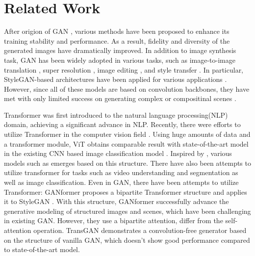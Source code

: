 \documentclass[10pt,twocolumn,letterpaper]{article}
\begin{document}
\section{Related Work}
After origion of GAN \cite{goodfellow2014generative}, various methods  \cite{arjovsky2017wasserstein, mao2017squares,miyato2018spectral,karras2018progressive} have been proposed to enhance its training stability and performance. As a result, fidelity and diversity of the generated images have dramatically improved. In addition to image synthesis task, GAN has been widely adopted in various tasks, such as image-to-image translation \cite{isola2018imagetoimage, zhu2020unpaired}, super resolution \cite{ledig2017photorealistic}, image editing \cite{yu2018generative}, and style transfer \cite{choi2018stargan}. In particular, StyleGAN-based architectures have been applied for various applications \cite{gabbay2019style,zhu2020semantically,Zhu_2020}. However, since all of these models are based on convolution backbones, they have met with only limited success on generating complex or compositinal scenes \cite{johnson2018image}. 


Transformer \cite{vaswani2017attention} was first introduced to the natural language processing(NLP) domain, achieving a significant advance in NLP. Recently, there were efforts to utilize Transformer in the computer vision field \cite{dosovitskiy2020image, bertasius2021spacetime, zheng2021rethinking}. 
Using huge amounts of data and a transformer module, ViT \cite{dosovitskiy2020image} obtains comparable result with state-of-the-art model in the existing CNN based image classification model \cite{tan2020efficientnet,kolesnikov2020big}. Inspired by \cite{dosovitskiy2020image}, various models such as \cite{graham2021levit,wu2021cvt,liu2021swin} emerges based on this structure. There have also been attempts to utilize transformer for tasks such as video understanding \cite{bertasius2021spacetime} and segmentation \cite{zheng2021rethinking} as well as image classification. 
Even in GAN, there have been attempts to utilize Transformer: GANformer \cite{hudson2021generative} proposes a bipartite Transformer structure and applies it to StyleGAN \cite{karras2019stylebased,karras2020analyzing}. With this structure, GANformer successfully advance the generative
modeling of structured images and scenes, which have been challenging in existing GAN. However, they use a bipartite attention, differ from the self-attention operation.
TransGAN\cite{jiang2021transgan} demonstrates a convolution-free generator based on the structure of vanilla GAN, which doesn’t show good performance compared to state-of-the-art model. 
\end{document}
